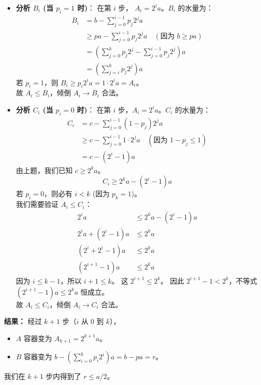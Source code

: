\documentclass{ctexart}
\begin{document}
\begin{itemize}
    \item \textbf{分析 $B_i$ (当 $p_i = 1$ 时)}：
    在第 $i$ 步， $A_i = 2^i a$。$B_i$ 的水量为：
    \begin{align*}
        B_i &= b - \sum_{j=0}^{i-1} p_j 2^j a \\
            &\ge pa - \sum_{j=0}^{i-1} p_j 2^j a \quad (\text{因为 } b \ge pa) \\
            &= \left( \sum_{j=0}^{k} p_j 2^j - \sum_{j=0}^{i-1} p_j 2^j \right) a \\
            &= \left( \sum_{j=i}^{k} p_j 2^j \right) a
    \end{align*}
    若 $p_i = 1$，则 $B_i \ge p_i 2^i a = 1 \cdot 2^i a = A_i$。\\
    故 $A_i \le B_i$，倾倒 $A_i \to B_i$ 合法。

    \item \textbf{分析 $C_i$ (当 $p_i = 0$ 时)}：
    在第 $i$ 步，$A_i = 2^i a$。$C_i$ 的水量为：
    \begin{align*}
        C_i &= c - \sum_{j=0}^{i-1} (1-p_j) 2^j a \\
            &\ge c - \sum_{j=0}^{i-1} 1 \cdot 2^j a \quad (\text{因为 } 1-p_j \le 1) \\
            &= c - (2^i-1)a
    \end{align*}
    由上题，我们已知 $c \ge 2^k a$。
    $$ C_i \ge 2^k a - (2^i-1)a $$
    若 $p_i = 0$，则必有 $i < k$ (因为 $p_k=1$)。\\
    我们需要验证 $A_i \le C_i$：
    \begin{align*}
        2^i a &\le 2^k a - (2^i-1)a \\
        2^i a + (2^i-1)a &\le 2^k a \\
        (2^i + 2^i - 1)a &\le 2^k a \\
        (2^{i+1}-1)a &\le 2^k a
    \end{align*}
    因为 $i \le k-1$，所以 $i+1 \le k$。
    这 $2^{i+1} \le 2^k$。
    因此 $2^{i+1}-1 < 2^k$，不等式 $ (2^{i+1}-1)a \le 2^k a $ 恒成立。\\
    故 $A_i \le C_i$，倾倒 $A_i \to C_i$ 合法。
\end{itemize}
\textbf{结果：}
经过 $k+1$ 步（$i$ 从 0 到 $k$），
\begin{itemize}
    \item $A$ 容器变为 $A_{k+1} = 2^{k+1}a$。
    \item $B$ 容器变为 $b - (\sum_{i=0}^k p_i 2^i)a = b - pa = r$。
\end{itemize}
我们在 $k+1$ 步内得到了 $r \le a/2$。
\end{document}
